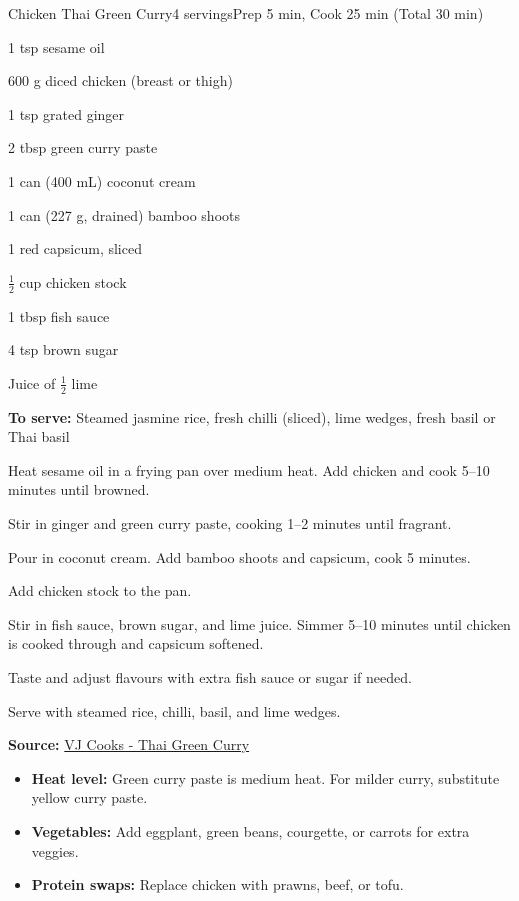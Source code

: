 \newpage
\begin{recipebox}{Chicken Thai Green Curry}{4 servings}{Prep 5 min, Cook 25 min (Total 30 min)}
\begin{ingredients}
  \item 1 tsp sesame oil
  \item 600 g diced chicken (breast or thigh)
  \item 1 tsp grated ginger
  \item 2 tbsp green curry paste
  \item 1 can (400 mL) coconut cream
  \item 1 can (227 g, drained) bamboo shoots
  \item 1 red capsicum, sliced
  \item $\tfrac{1}{2}$ cup chicken stock
  \item 1 tbsp fish sauce
  \item 4 tsp brown sugar
  \item Juice of $\tfrac{1}{2}$ lime
  \item \textbf{To serve:} Steamed jasmine rice, fresh chilli (sliced), lime wedges, fresh basil or Thai basil
\end{ingredients}

\begin{method}
  \item Heat sesame oil in a frying pan over medium heat. Add chicken and cook 5--10 minutes until browned.
  \item Stir in ginger and green curry paste, cooking 1--2 minutes until fragrant.
  \item Pour in coconut cream. Add bamboo shoots and capsicum, cook 5 minutes.
  \item Add chicken stock to the pan.
  \item Stir in fish sauce, brown sugar, and lime juice. Simmer 5--10 minutes until chicken is cooked through and capsicum softened.
  \item Taste and adjust flavours with extra fish sauce or sugar if needed.
  \item Serve with steamed rice, chilli, basil, and lime wedges.
\end{method}

\textbf{Source:} \href{https://vjcooks.com/chicken-thai-green-curry/#mv-creation-759-jtr}{VJ Cooks - Thai Green Curry}

\begin{notes}
\begin{itemize}
  \item \textbf{Heat level:} Green curry paste is medium heat. For milder curry, substitute yellow curry paste.
  \item \textbf{Vegetables:} Add eggplant, green beans, courgette, or carrots for extra veggies.
  \item \textbf{Protein swaps:} Replace chicken with prawns, beef, or tofu.
\end{itemize}
\end{notes}
\end{recipebox}

